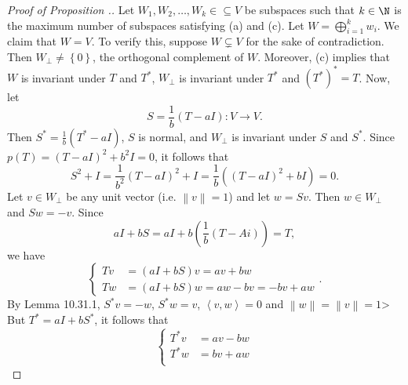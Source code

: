 \documentclass[linearalgebra]{subfiles}
\begin{document}

    \begin{proof}[Proof of Proposition \thechapter.\thestcounter]
        Let $W_1,W_2,\ldots,W_k\in\subseteq V$ be subspaces such that $k\in\N$ is the maximum number of subspaces satisfying (a) and (c). Let $W = \bigoplus^{k}_{i=1} w_i$. We claim that $W= V$. To verify this, suppose $W\subsetneq V$ for the sake of contradiction. Then $W_\perp\neq\left\lbrace 0 \right\rbrace$, the orthogonal complement of $W$. Moreover, (c) implies that $W$ is invariant under $T$ and $T^{*}$, $W_\perp$ is invariant under $T^{*}$ and $\left( T^{*}  \right) ^{*}  = T$. Now, let
        \begin{equation*}
            S = \frac{1}{b}\left( T-aI \right) : V\to V.
        \end{equation*}
        Then $S^{*} = \frac{1}{b}\left( T^{*} - aI \right)$, $S$ is normal, and $W_\perp$ is invariant under $S$ and $S^{*}$. Since $p(T) = \left( T-aI \right) ^{2} + b^2I = 0$, it follows that
        \begin{equation*}
            S^2+I = \frac{1}{b^2} \left( T-aI \right) ^2 + I = \frac{1}{b} \left( \left( T-aI \right)^2 + bI \right) = 0.
        \end{equation*}
        Let $v\in W_\perp$ be any unit vector (i.e. $\left\lVert v\right\rVert = 1$) and let $w=Sv$. Then $w\in W_\perp$ and $Sw = -v$. Since
        \begin{equation*}
            aI + bS = aI + b\left( \frac{1}{b}\left( T-Ai \right)  \right) = T,
        \end{equation*}
        we have
        \begin{equation*}
            \begin{cases} 
                Tv & = \left( aI+bS \right) v = av+bw \\
                Tw & = \left( aI+bS \right) w = aw-bv = -bv+aw
            \end{cases}.
        \end{equation*}
        By Lemma 10.31.1, $S^{*} v = -w$, $S^{*} w = v$, $\left\langle v, w\right\rangle = 0$ and $\left\lVert w\right\rVert =\left\lVert v\right\rVert = 1$> But $T^{*}  = aI + bS^{*}$, it follows that
        \begin{equation*}
            \begin{cases} 
                T^{*} v & = av - bw \\
                T^{*} w & = bv + aw \\

\end{cases}
\end{equation*}
\end{proof}
\end{document}
